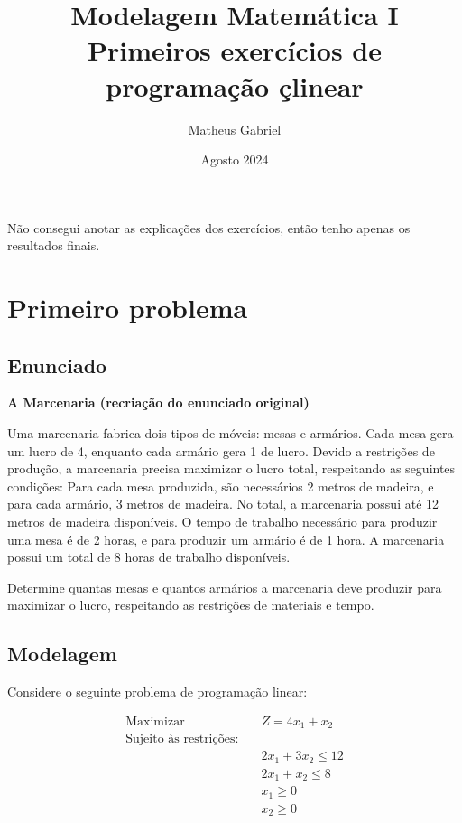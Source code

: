 \documentclass{article}
\title{Modelagem Matemática I \\ 
        \large Primeiros exercícios de programação çlinear}
\author{Matheus Gabriel}
\date{Agosto 2024}
\begin{document}
\maketitle

\begin{tcolorbox}[colback=yellow!10!white, colframe=yellow!75!black, title=Aviso]
Não consegui anotar as explicações dos exercícios, então tenho apenas os resultados finais. 
\end{tcolorbox}

\section{Primeiro problema}

\subsection{Enunciado}
\begin{mdframed}[backgroundcolor=yellow!10, linecolor=black, linewidth=2pt]
\textbf{A Marcenaria (recriação do enunciado original)}

Uma marcenaria fabrica dois tipos de móveis: mesas e armários. Cada mesa gera um lucro de 4, enquanto cada armário gera 1 de lucro. Devido a restrições de produção, a marcenaria precisa maximizar o lucro total, respeitando as seguintes condições:
Para cada mesa produzida, são necessários 2 metros de madeira, e para cada armário, 3 metros de madeira. No total, a marcenaria possui até 12 metros de madeira disponíveis.
O tempo de trabalho necessário para produzir uma mesa é de 2 horas, e para produzir um armário é de 1 hora. A marcenaria possui um total de 8 horas de trabalho disponíveis.

Determine quantas mesas e quantos armários a marcenaria deve produzir para maximizar o lucro, respeitando as restrições de materiais e tempo.
\end{mdframed}

\subsection{Modelagem}

Considere o seguinte problema de programação linear:

\begin{align*}
    \text{Maximizar} \quad & Z = 4x_1 + x_2 \\
    \text{Sujeito às restrições:} \quad & \\
    & 2x_1 + 3x_2 \leq 12 \\
    & 2x_1 + x_2 \leq 8 \\
    & x_1 \geq 0 \\
    & x_2 \geq 0
\end{align*}
\end{document}
